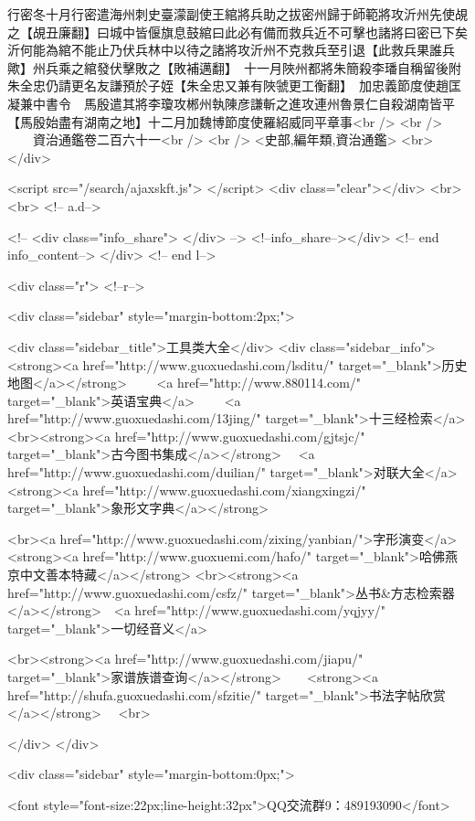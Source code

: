 行密冬十月行密遣海州刺史臺濛副使王綰將兵助之拔密州歸于師範將攻沂州先使覘之【覘丑廉翻】曰城中皆偃旗息鼓綰曰此必有備而救兵近不可擊也諸將曰密已下矣沂何能為綰不能止乃伏兵林中以待之諸將攻沂州不克救兵至引退【此救兵果誰兵歟】州兵乘之綰發伏擊敗之【敗補邁翻】　十一月陜州都將朱簡殺李璠自稱留後附朱全忠仍請更名友謙預於子姪【朱全忠又兼有陜虢更工衡翻】　加忠義節度使趙匡凝兼中書令　馬殷遣其將李瓊攻郴州執陳彦謙斬之進攻連州魯景仁自殺湖南皆平【馬殷始盡有湖南之地】十二月加魏博節度使羅紹威同平章事<br />
<br />
　　資治通鑑卷二百六十一<br />
<br />
<史部,編年類,資治通鑑>  <br>
   </div> 

<script src="/search/ajaxskft.js"> </script>
 <div class="clear"></div>
<br>
<br>
 <!-- a.d-->

 <!--
<div class="info_share">
</div> 
-->
 <!--info_share--></div>   <!-- end info_content-->
  </div> <!-- end l-->

<div class="r">   <!--r-->



<div class="sidebar"  style="margin-bottom:2px;">

 
<div class="sidebar_title">工具类大全</div>
<div class="sidebar_info">
<strong><a href="http://www.guoxuedashi.com/lsditu/" target="_blank">历史地图</a></strong>　　
<a href="http://www.880114.com/" target="_blank">英语宝典</a>　　
<a href="http://www.guoxuedashi.com/13jing/" target="_blank">十三经检索</a>　
<br><strong><a href="http://www.guoxuedashi.com/gjtsjc/" target="_blank">古今图书集成</a></strong>　
<a href="http://www.guoxuedashi.com/duilian/" target="_blank">对联大全</a>　<strong><a href="http://www.guoxuedashi.com/xiangxingzi/" target="_blank">象形文字典</a></strong>　

<br><a href="http://www.guoxuedashi.com/zixing/yanbian/">字形演变</a>　　<strong><a href="http://www.guoxuemi.com/hafo/" target="_blank">哈佛燕京中文善本特藏</a></strong>
<br><strong><a href="http://www.guoxuedashi.com/csfz/" target="_blank">丛书&方志检索器</a></strong>　<a href="http://www.guoxuedashi.com/yqjyy/" target="_blank">一切经音义</a>　　

<br><strong><a href="http://www.guoxuedashi.com/jiapu/" target="_blank">家谱族谱查询</a></strong>　　<strong><a href="http://shufa.guoxuedashi.com/sfzitie/" target="_blank">书法字帖欣赏</a></strong>　
<br>

</div>
</div>


<div class="sidebar" style="margin-bottom:0px;">

<font style="font-size:22px;line-height:32px">QQ交流群9：489193090</font>


